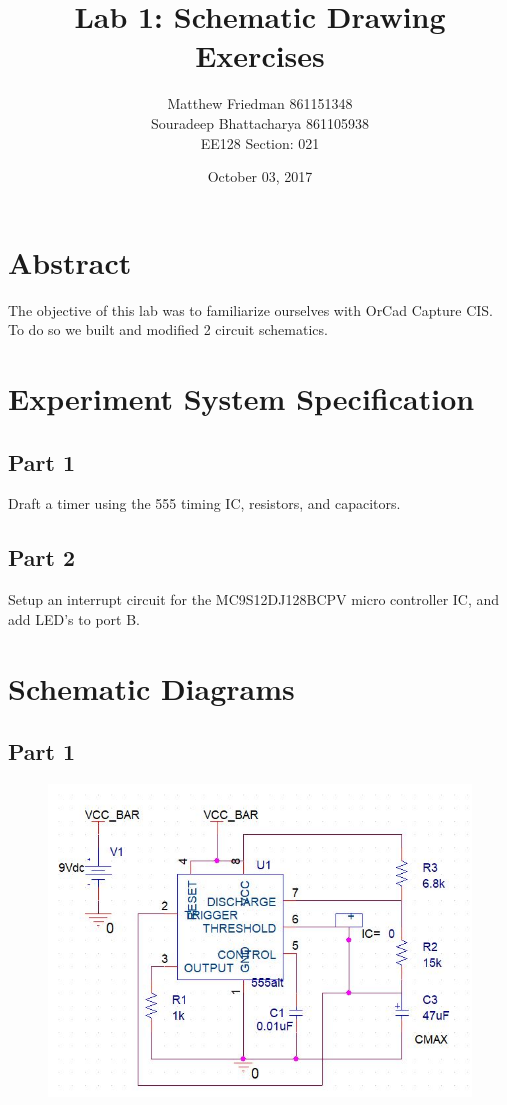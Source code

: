 \documentclass{article}
\title{Lab 1: Schematic Drawing Exercises}
\date{October 03, 2017}
\author{Matthew Friedman 861151348 \\ Souradeep Bhattacharya 861105938\\ EE128 Section: 021}
\begin{document}
	\maketitle
	
	\section*{Abstract}
	The objective of this lab was to familiarize ourselves with OrCad Capture CIS. To do so we built and modified 2 circuit schematics.
	\section*{Experiment System Specification}
	\subsection*{Part 1}
	Draft a timer using the 555 timing IC, resistors, and capacitors.
	\subsection*{Part 2}
	Setup an interrupt circuit for the MC9S12DJ128BCPV micro controller IC, and add LED’s to port B.
	
	\section*{Schematic Diagrams}
	\subsection*{Part 1}
	\begin{figure}[H]
		\centering
		\includegraphics[width=1\textwidth]{part1}
	\end{figure}
\end{document}
